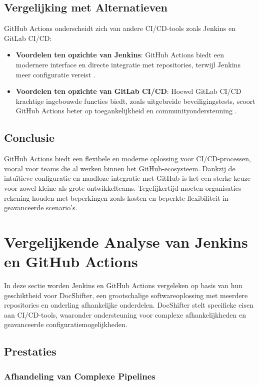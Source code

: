 \subsection{Vergelijking met Alternatieven}

GitHub Actions onderscheidt zich van andere CI/CD-tools zoals Jenkins en GitLab CI/CD:
\begin{itemize}
    \item \textbf{Voordelen ten opzichte van Jenkins}: GitHub Actions biedt een modernere interface en directe integratie met repositories, terwijl Jenkins meer configuratie vereist \autocite{spacelift2023}.
    \item \textbf{Voordelen ten opzichte van GitLab CI/CD}: Hoewel GitLab CI/CD krachtige ingebouwde functies biedt, zoals uitgebreide beveiligingstests, scoort GitHub Actions beter op toegankelijkheid en communityondersteuning \autocite{kulkarni2022}.
\end{itemize}

\subsection{Conclusie}

GitHub Actions biedt een flexibele en moderne oplossing voor CI/CD-processen, vooral voor teams die al werken binnen het GitHub-ecosysteem. Dankzij de intuïtieve configuratie en naadloze integratie met GitHub is het een sterke keuze voor zowel kleine als grote ontwikkelteams. Tegelijkertijd moeten organisaties rekening houden met beperkingen zoals kosten en beperkte flexibiliteit in geavanceerde scenario's.


\section{Vergelijkende Analyse van Jenkins en GitHub Actions}

In deze sectie worden Jenkins en GitHub Actions vergeleken op basis van hun geschiktheid voor DocShifter, een grootschalige softwareoplossing met meerdere repositories en onderling afhankelijke onderdelen. DocShifter stelt specifieke eisen aan CI/CD-tools, waaronder ondersteuning voor complexe afhankelijkheden en geavanceerde configuratiemogelijkheden.

\subsection{Prestaties}

\subsubsection{Afhandeling van Complexe Pipelines}

